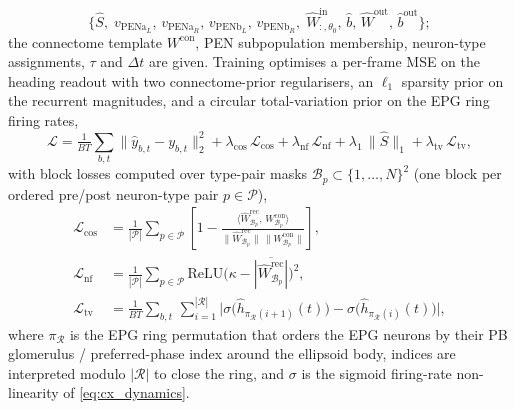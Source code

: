 \documentclass[11pt]{article}
\def\relu{\mathrm{ReLU}}
\begin{document}
\begin{equation*}
\big\{\hat{S},\;
v_{\mathrm{PENa}_L},\,v_{\mathrm{PENa}_R},\,v_{\mathrm{PENb}_L},\,v_{\mathrm{PENb}_R},\;
\hat{W}^{\mathrm{in}}_{:,\theta_0},\,\hat{b},\,\hat{W}^{\mathrm{out}},\,\hat{b}^{\mathrm{out}}\big\};
\end{equation*}
the connectome template $W^{\mathrm{con}}$, PEN subpopulation membership, neuron-type assignments, $\tau$ and $\Delta t$ are given. Training optimises a per-frame MSE on the heading readout with two connectome-prior regularisers, an $\ell_1$ sparsity prior on the recurrent magnitudes, and a circular total-variation prior on the EPG ring firing rates,
\begin{equation}
\mathcal{L}
= \tfrac{1}{BT}\sum_{b,t} \|\hat{y}_{b,t} - y_{b,t}\|_2^2
+ \lambda_{\mathrm{cos}}\,\mathcal{L}_{\mathrm{cos}}
+ \lambda_{\mathrm{nf}}\,\mathcal{L}_{\mathrm{nf}}
+ \lambda_{1}\,\|\hat{S}\|_1
+ \lambda_{\mathrm{tv}}\,\mathcal{L}_{\mathrm{tv}},
\label{eq:cx_loss}
\end{equation}
with block losses computed over type-pair masks $\mathcal{B}_p\subset\{1,\dots,N\}^2$ (one block per ordered pre/post neuron-type pair $p\in\mathcal{P}$),
\begin{align}
\mathcal{L}_{\mathrm{cos}} &= \tfrac{1}{|\mathcal{P}|}\sum_{p\in\mathcal{P}}\!\left[1 - \frac{\langle \hat{W}^{\mathrm{rec}}_{\mathcal{B}_p},\,W^{\mathrm{con}}_{\mathcal{B}_p}\rangle}{\|\hat{W}^{\mathrm{rec}}_{\mathcal{B}_p}\|\,\|W^{\mathrm{con}}_{\mathcal{B}_p}\|}\right],
\label{eq:cx_cos}\\
\mathcal{L}_{\mathrm{nf}} &= \tfrac{1}{|\mathcal{P}|}\sum_{p\in\mathcal{P}} \relu\!\big(\kappa - \overline{|\hat{W}^{\mathrm{rec}}_{\mathcal{B}_p}|}\big)^2,
\label{eq:cx_nf}\\
\mathcal{L}_{\mathrm{tv}} &= \tfrac{1}{BT}\sum_{b,t}\,\sum_{i=1}^{|\mathcal{R}|}
\Big|\sigma\!\big(\hat h_{\pi_{\mathcal{R}}(i+1)}(t)\big)
   - \sigma\!\big(\hat h_{\pi_{\mathcal{R}}(i)}(t)\big)\Big|,
\label{eq:cx_tv}
\end{align}
where $\pi_{\mathcal{R}}$ is the EPG ring permutation that orders the EPG neurons by their PB glomerulus / preferred-phase index around the ellipsoid body, indices are interpreted modulo $|\mathcal{R}|$ to close the ring, and $\sigma$ is the sigmoid firing-rate non-linearity of \cref{eq:cx_dynamics}.
\end{document}
